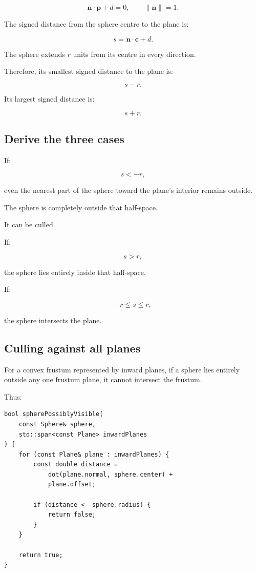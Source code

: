 \[
 \mathbf n\cdot\mathbf p+d=0, \qquad \|\mathbf n\|=1.
\]

The signed distance from the sphere centre to the plane is:

\[
 \boxed{ s=\mathbf n\cdot\mathbf c+d }.
\]

The sphere extends \(r\) units from its centre in every direction.

Therefore, its smallest signed distance to the plane is:

\[
 s-r.
\]

Its largest signed distance is:

\[
 s+r.
\]

\subsection{Derive the three cases}\label{02-foundations-ii-ch034-derive-the-three-cases}

If:

\[
 \boxed{s<-r},
\]

even the nearest part of the sphere toward the plane's interior remains outside.

The sphere is completely outside that half-space.

It can be culled.

If:

\[
 \boxed{s>r},
\]

the sphere lies entirely inside that half-space.

If:

\[
 \boxed{-r\le s\le r},
\]

the sphere intersects the plane.

\subsection{Culling against all planes}\label{02-foundations-ii-ch034-culling-against-all-planes}

For a convex frustum represented by inward planes, if a sphere lies entirely outside any one frustum plane, it cannot intersect the frustum.

Thus:

\begin{verbatim}
bool spherePossiblyVisible(
    const Sphere& sphere,
    std::span<const Plane> inwardPlanes
) {
    for (const Plane& plane : inwardPlanes) {
        const double distance =
            dot(plane.normal, sphere.center) +
            plane.offset;

        if (distance < -sphere.radius) {
            return false;
        }
    }

    return true;
}
\end{verbatim}

